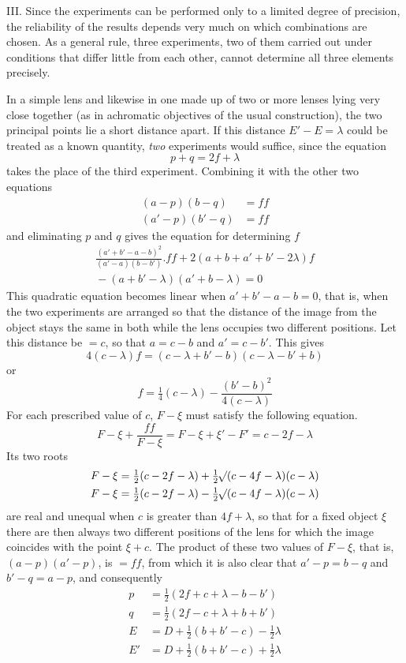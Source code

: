 III. Since the experiments can be performed only to a limited degree of precision, the reliability of the results depends very much on which combinations are chosen. As a general rule, three experiments, two of them carried out under conditions that differ little from each other, cannot determine all three elements precisely.

In a simple lens and likewise in one made up of two or more lenses lying very close together (as in achromatic objectives of the usual construction), the two principal points lie a short distance apart. If this distance $E'-E=\lambda$ could be treated as a known quantity, \textit{two} experiments would suffice, since the equation
\[
p+q=2f+\lambda
\]
takes the place of the third experiment. Combining it with the other two equations
\[
\begin{aligned}
(a-p)(b-q)&=ff\\
(a'-p)(b'-q)&=ff
\end{aligned}
\]
and eliminating $p$ and $q$ gives the equation for determining $f$
\[
\begin{aligned}
\frac{(a'+b'-a-b)^2}{(a'-a)(b-b')}.ff+2(a+b+a'+b'-2\lambda)f\\
{}-(a+b'-\lambda)(a'+b-\lambda)=0
\end{aligned}
\]
This quadratic equation becomes linear when $a'+b'-a-b=0$, that is, when the two experiments are arranged so that the distance of the image from the object stays the same in both while the lens occupies two different positions. Let this distance be $=c$, so that $a=c-b$ and $a'=c-b'$. This gives
\[
4(c-\lambda)f=(c-\lambda+b'-b)(c-\lambda-b'+b)
\]
or
\[
f=\tfrac14(c-\lambda)-\frac{(b'-b)^2}{4(c-\lambda)}
\]
For each prescribed value of $c$, $F-\xi$ must satisfy the following equation.
\[
F-\xi+\frac{ff}{F-\xi}=F-\xi+\xi'-F'=c-2f-\lambda
\]
Its two roots
\[
\begin{aligned}
F-\xi&=\tfrac12(c-2f-\lambda)+\tfrac12\mathord{{}^{}\!\surd}(c-4f-\lambda)(c-\lambda)\\
F-\xi&=\tfrac12(c-2f-\lambda)-\tfrac12\mathord{{}^{}\!\surd}(c-4f-\lambda)(c-\lambda)
\end{aligned}
\]
are real and unequal when $c$ is greater than $4f+\lambda$, so that for a fixed object $\xi$ there are then always two different positions of the lens for which the image coincides with the point $\xi+c$. The product of these two values of $F-\xi$, that is, $(a-p)(a'-p)$, is $=ff$, from which it is also clear
that $a'-p=b-q$ and $b'-q=a-p$, and consequently
\[
\begin{aligned}
p&=\tfrac12(2f+c+\lambda-b-b')\\
q&=\tfrac12(2f-c+\lambda+b+b')\\
E&=D+\tfrac12(b+b'-c)-\tfrac12\lambda\\
E'&=D+\tfrac12(b+b'-c)+\tfrac12\lambda
\end{aligned}
\]

